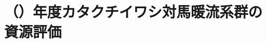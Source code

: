 \chapter{\thisyrjp（\thisyrad）年度カタクチイワシ対馬暖流系群の資源評価}
%










\clearpage%
%
\setcounter{chapter}{0}
